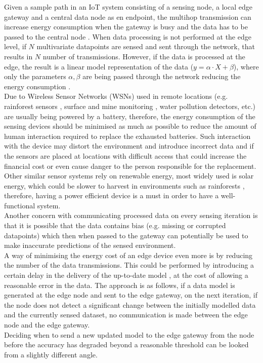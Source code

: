 \documentclass{mpaper}
\begin{document}
Given a sample path in an IoT system consisting of a sensing node, a local edge gateway and a central data node as en endpoint, the multihop transmission can increase energy consumption when the gateway is busy and the data has to be passed to the central node \cite{shi2016}. When data processing is not performed at the edge level, if $N$ multivariate datapoints are sensed and sent through the network, that results in $N$ number of transmissions. However, if the data is processed at the edge, the result is a linear model representation of the data ($y = \alpha\cdot X + \beta$), where only the parameters $\alpha, \beta$ are being passed through the network reducing the energy consumption \cite{tanluizhang2011}.\\
Due to Wireless Sensor Networks (WSNs) used in remote locations (e.g. rainforest sensors  \cite{rainforests2009}, surface and mine monitoring \cite{Akkas2018}, water pollution detectors\cite{waterwsn2017}, etc.) are usually being powered by a battery, therefore, the energy consumption of the sensing devices should be minimised as much as possible to reduce the amount of human interaction required to replace the exhausted batteries. Such interaction with the device may distort the environment and introduce incorrect data and if the sensors are placed at locations with difficult access that could increase the financial cost or even cause danger to the person responsible for the replacement.\\
Other similar sensor systems rely on renewable energy, most widely used is solar energy, which could be slower to harvest in environments such as rainforests \cite{rainforests2009}, therefore, having a power efficient device is a must in order to have a well-functional system.\\
Another concern with communicating processed data on every sensing iteration is that it is possible that the data contains bias (e.g. missing or corrupted datapoints) \cite{anagnostop2016} which then when passed to the gateway can potentially be used to make inaccurate predictions of the sensed environment.\\
A way of minimising the energy cost of an edge device even more is by reducing the number of the data transmissions. This could be performed by introducing a certain delay in the delivery of the up-to-date model \citep{anagnostop2014, anagnostop2016, anagnostopkolomvatos2016}, at the cost of allowing a reasonable error in the data. 
The approach is as follows, if a data model is generated at the edge node and sent to the edge gateway, on the next iteration, if the node does not detect a significant change between the initially modelled data and the currently sensed dataset, no communication is made between the edge node and the edge gateway.\\
Deciding when to send a new updated model to the edge gateway from the node before the accuracy has degraded beyond a reasonable threshold can be looked from a slightly different angle. 
\end{document}
